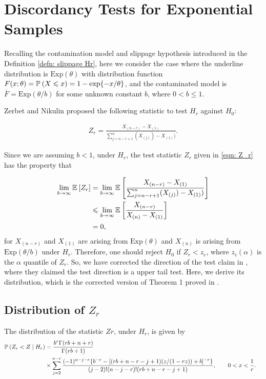 \documentclass{report}
\begin{document}
\section{Discordancy Tests for Exponential Samples}

Recalling the contamination model and slippage hypothesis introduced in the Definition \ref{defn: slippage Hr}, here
we consider the case where the underline distribution is $\mathrm{Exp}(\theta)$ with distribution function $F(x;\theta) = \P{X \leqslant x} = 1 -\exp{-x/\theta}$,
and the contaminated model is $\overline F = \mathrm{Exp}(\theta/b)$ for some unknown constant $b$, where $0 < b \leqslant 1$.

Zerbet and Nikulin \cite{zerbet2003new} proposed the following statistic to test $H_r$ against $H_0$:

\begin{align} \label{eqn: Z_r}
    Z_r = \frac{X_{(n-r)} - X_{(1)}}{\sum_{j=n-r+1}^n (X_{(j)}) - X_{(1)})}.
\end{align}

Since we are assuming $b <1$, under $H_r$, the test statistic $Z_r$ given in \eqref{eqn: Z_r} has the property that

\begin{align*}  
    \lim_{b \to \infty} \E{Z_r} &= \lim_{b \to \infty} \E{\frac{X_{(n-r)} - X_{(1)}}{\sum_{j=n-r+1}^n (X_{(j)}) - X_{(1)})}}
    \\
    &\leqslant \lim_{b \to \infty} \E{\frac{X_{(n-r)}}{X_{(n)} - X_{(1)}}}
    \\
    &= 0,
\end{align*}
for $X_{(n-r)}$ and $X_{(1)}$ are arising from $\mathrm{Exp}(\theta)$ and $X_{(n)}$ is arising from $\mathrm{Exp}(\theta/b)$ under $H_r$. 
Therefore, one should reject $H_0$ if $Z_r < z_c$, where $z_c(\alpha)$ is the $\alpha$ quantile of $Z_r$. So, we have corrected the direction of the test claim in \cite{zerbet2003new}, where they claimed the test direction is a upper tail test.
Here, we derive its distribution, which is the corrected version of Theorem 1 proved in \cite{zerbet2003new}.

\subsection{Distribution of $Z_r$}

\begin{thm} \label{thm: distribution of Z_r}

The distribution of the statistic $Zr$, under $H_r$, is given by
    \begin{align*}
        \P{Z_r < Z \mid H_r} &\begin{aligned}[t]
            &= \frac{b^{r}\Gamma(rb+n+r)}{\Gamma(rb+1)} 
            \\
            &\times \sum_{j=2}^{n-r} \frac{(-1)^{n-j-r}\{b^{-r} - [(rb + n-r-j+1)(z/(1-rz))+b]^{-r}\}}{(j-2)!(n-j-r)!(rb+n-r-j+1)}, \qquad 0 < x < \frac{1}{r}.
        \end{aligned}
    \end{align*}
\end{thm}
\end{document}
